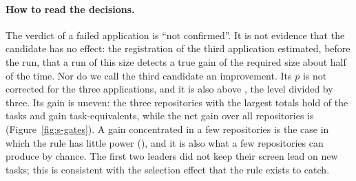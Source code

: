 \paragraph{How to read the decisions.}
The verdict of a failed application is ``not confirmed''. It is not evidence that the candidate has no effect: the
registration of the third application estimated, before the run, that a run of this size detects a true gain of the
required size about half of the time. Nor do we call the third candidate an improvement. Its $p$ is not corrected for
the three applications, and it is also above \SGateAlphaSplit, the level divided by three. Its gain is uneven: the
three repositories with the largest totals hold \SGateThreeTopThreeTasks{} of the \SGateThreeTasks{} tasks and gain
\SGateThreeTopThree{} task-equivalents, while the net gain over all repositories is \SGateThreeNet{}
(Figure~\ref{fig:s-gates}). A gain concentrated in a few repositories is the case in which the rule has little
power (), and it is also what a few repositories can produce by chance. The first two leaders did not keep
their screen lead on new tasks; this is consistent with the selection effect that the rule exists to catch.
